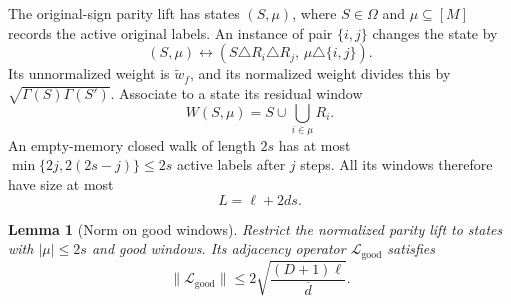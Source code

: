 \documentclass[letterpaper,11pt]{article}
\newtheorem{lemma}[theorem]{Lemma}
\theoremstyle{definition}
\begin{document}
The original-sign parity lift has states $(S,\mu)$, where
$S\in\Omega$ and $\mu\subseteq[M]$ records the active original labels.
An instance of pair $\{i,j\}$ changes the state by
\[
 (S,\mu)\longleftrightarrow
 (S\triangle R_i\triangle R_j,\,\mu\triangle\{i,j\}).
\]
Its unnormalized weight is $\widetilde w_f$, and its normalized weight
divides this by $\sqrt{\Gamma(S)\Gamma(S')}$.
Associate to a state its residual window
\[
 W(S,\mu)=S\cup\bigcup_{i\in\mu}R_i.
\]
An empty-memory closed walk of length $2s$ has at most
$\min\{2j,2(2s-j)\}\leq2s$ active labels after $j$ steps.  All its
windows therefore have size at most
\begin{equation}\label{odd:eq:window-size}
 L=\ell+2ds.
\end{equation}

\begin{lemma}[Norm on good windows]\label{odd:lem:good-norm}
Restrict the normalized parity lift to states with $|\mu|\leq2s$ and
good windows.  Its adjacency operator $\mathcal L_{\mathrm{good}}$ satisfies
\begin{equation}\label{odd:eq:good-norm}
 \|\mathcal L_{\mathrm{good}}\|
 \leq2\sqrt{\frac{(D+1)\ell}{\overline d}}.
\end{equation}
\end{lemma}
\end{document}

